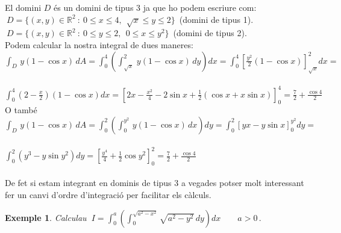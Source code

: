 \documentclass[12pt]{article}
\newtheorem{exemple}{Exemple}[subsection]
\newcommand{\R}{\mathbb{R}}
\begin{document}
\vspace*{1cm}

El domini $D$ {\'e}s un domini de tipus 3 ja que ho podem escriure com:\\

$\ D=\{(x,y)\in\R^2\ :\ 0\leq x\leq 4,\ \ \sqrt{x}\leq y\leq 2\}\,$
(domini de tipus 1).\\

$\ D=\{(x,y)\in\R^2\ :\ 0\leq y\leq 2,\ \ 0\leq x\leq y^2\}\,$
(domini de tipus 2).\\

Podem calcular la nostra integral de dues maneres:\\

\hspace*{1cm}$\displaystyle\int_D\,y(1-\cos x)\,dA=
\int_0^{4}\left(\int_{\sqrt{x}}^{2}\,y(1-\cos x)\,
dy\right)dx=\int_0^{4}\left[\frac{y^2}{2} (1- \cos x)\right]_{\sqrt{x}}^{2}dx=$\\\\


\hspace*{1cm}$\displaystyle\int_0^{4}\left(2-\frac{x}{2}\right)\left(1-\cos
x\right)dx=\left[2x-\frac{x^2}{4}-2\sin
x+\frac{1}{2}(\cos x+x\sin x)\right]_0^{4}=\frac{7}{2}+\frac{\cos 4}{2}$\\

O tamb{\'e}\\

\hspace*{1cm}$\displaystyle\int_D\,y(1-\cos x)\,dA=
\int_0^{2}\left(\int_{0}^{y^2}\,y(1-\cos x)\,
dx\right)dy=\int_0^{2}[yx -y\sin x]_0^{y^2}dy=$\\\\


\hspace*{1cm}$\displaystyle\int_0^{2}(y^3-y \sin
y^2)dy=\left[\frac{y^4}{4}+\frac{1}{2}\cos
y^2\right]_0^{2}=\frac{7}{2}+\frac{\cos 4}{2}$\\\\

De fet si estam integrant en dominis de tipus 3 a vegades potser
molt interessant fer un canvi d'ordre d'integraci{\'o} per facilitar els
c{\`a}lculs.\\

\begin{exemple}
Calculau $\ \displaystyle
I=\int_0^a\left(\int_0^{\sqrt{a^2-x^2}}\sqrt{a^2-y^2}\,dy\right)dx\qquad
a>0\,.$
\end{exemple}
\end{document}
